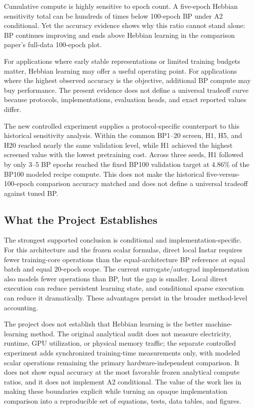 \documentclass{article}
\begin{document}
    Cumulative compute is highly sensitive to epoch count. A five-epoch Hebbian sensitivity total can be hundreds of times below 100-epoch BP under A2 conditional. Yet the accuracy evidence shows why this ratio cannot stand alone: BP continues improving and ends above Hebbian learning in the comparison paper's full-data 100-epoch plot.
    
    For applications where early stable representations or limited training budgets matter, Hebbian learning may offer a useful operating point. For applications where the highest observed accuracy is the objective, additional BP compute may buy performance. The present evidence does not define a universal tradeoff curve because protocols, implementations, evaluation heads, and exact reported values differ.

    {\color{red}The new controlled experiment supplies a protocol-specific counterpart to this historical sensitivity analysis. Within the common BP1--20 screen, H1, H5, and H20 reached nearly the same validation level, while H1 achieved the highest screened value with the lowest pretraining cost. Across three seeds, H1 followed by only 3--5 BP epochs reached the fixed BP100 validation target at 4.86\% of the BP100 modeled recipe compute. This does not make the historical five-versus-100-epoch comparison accuracy matched and does not define a universal tradeoff against tuned BP.}
    
    \subsection{What the Project Establishes}
    
    The strongest supported conclusion is conditional and implementation-specific. For this architecture and the frozen scalar formulas, direct local Instar requires fewer training-core operations than the equal-architecture BP reference at equal batch and equal 20-epoch scope. The current surrogate/autograd implementation also models fewer operations than BP, but the gap is smaller. Local direct execution can reduce persistent learning state, and conditional sparse execution can reduce it dramatically. These advantages persist in the broader method-level accounting.
    
    The project does not establish that Hebbian learning is the better machine-learning method. {\color{red}The original analytical audit does not measure electricity, runtime, GPU utilization, or physical memory traffic; the separate controlled experiment adds synchronized training-time measurements only, with modeled scalar operations remaining the primary hardware-independent comparison.} It does not show equal accuracy at the most favorable frozen analytical compute ratios, and it does not implement A2 conditional. The value of the work lies in making these boundaries explicit while turning an opaque implementation comparison into a reproducible set of equations, tests, data tables, and figures.
    
\end{document}
